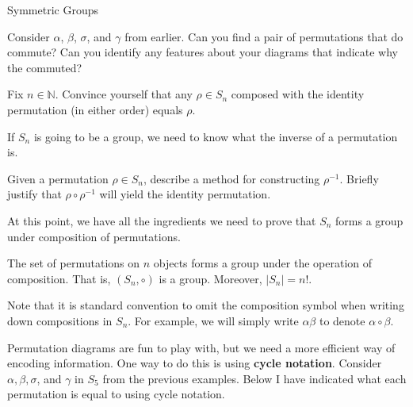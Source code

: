 \begin{section}{Symmetric Groups}
\begin{exercise}
Consider $\alpha$, $\beta$, $\sigma$, and $\gamma$ from earlier.  Can you find a pair of permutations that do commute?  Can you identify any features about your diagrams that indicate why the commuted?
\end{exercise}

\begin{exercise}
Fix $n\in\mathbb{N}$.  Convince yourself that any $\rho\in S_n$ composed with the identity permutation (in either order) equals $\rho$.
\end{exercise}

If $S_n$ is going to be a group, we need to know what the inverse of a permutation is.

\begin{problem}
Given a permutation $\rho\in S_n$, describe a method for constructing $\rho^{-1}$.  Briefly justify that $\rho \circ \rho^{-1}$ will yield the identity permutation.
\end{problem}

At this point, we have all the ingredients we need to prove that $S_n$ forms a group under composition of permutations.

\begin{theorem}
The set of permutations on $n$ objects forms a group under the operation of composition.  That is, $(S_n,\circ)$ is a group.  Moreover, $|S_n|=n!$.
\end{theorem}

Note that it is standard convention to omit the composition symbol when writing down compositions in $S_n$.  For example, we will simply write $\alpha\beta$ to denote $\alpha \circ \beta$.

Permutation diagrams are fun to play with, but we need a more efficient way of encoding information.  One way to do this is using \textbf{cycle notation}.  Consider $\alpha, \beta, \sigma$, and $\gamma$ in $S_{5}$ from the previous examples.  Below I have indicated what each permutation is equal to using cycle notation.


\end{section}
